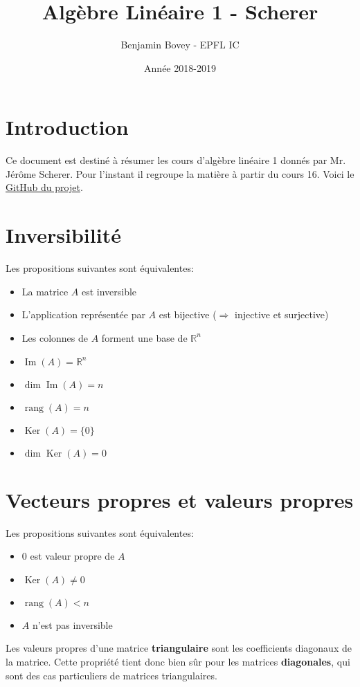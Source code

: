 \documentclass{article}
\title{Algèbre Linéaire 1 - Scherer}
\author{Benjamin Bovey -  EPFL IC}
\date{Année 2018-2019}
\DeclareMathOperator{\rang}{rang}
\DeclareMathOperator{\im}{Im}
\DeclareMathOperator{\ke}{Ker}
\begin{document}
\maketitle

\section*{Introduction}
Ce document est destiné à résumer les cours d'algèbre linéaire 1 donnés par Mr. Jérôme Scherer. Pour l'instant il regroupe la matière à partir du cours 16. Voici le \href{https://github.com/Arakniode/almighty-handbook-of-sleep-deprived-student}{GitHub du projet}.

\section{Inversibilité}
Les propositions suivantes sont équivalentes:
\begin{itemize}
	\item La matrice \(A\) est inversible
	\item L'application représentée par \(A\) est bijective (\(\Rightarrow\) injective et surjective)
	\item Les colonnes de \(A\) forment une base de \(\mathbb{R}^n\)
	\item \(\im(A) = \mathbb{R}^n\)
	\item \(\dim \im(A) = n\)
	\item \(\rang(A) = n\)
	\item \(\ke(A) = \{0\}\)
	\item \(\dim \ke(A) = 0\)
\end{itemize}

\section{Vecteurs propres et valeurs propres}
Les propositions suivantes sont équivalentes:
\begin{itemize}
	\item \(0\) est valeur propre de \(A\)
	\item \(\ke(A) \neq 0\)
	\item \(\rang(A) < n\)
	\item \(A\) n'est pas inversible
\end{itemize}
Les valeurs propres d'une matrice \textbf{triangulaire} sont les coefficients diagonaux de la matrice. Cette propriété tient donc bien sûr pour les matrices \textbf{diagonales}, qui sont des cas particuliers de matrices triangulaires.
\end{document}
